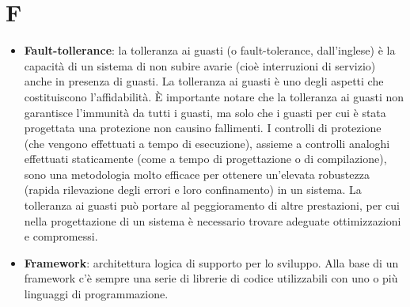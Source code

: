 \section{F}
\begin{itemize} 
	\item
	\textbf{Fault-tollerance}: la tolleranza ai guasti (o fault-tolerance, dall'inglese) è la capacità di un sistema di non subire avarie (cioè interruzioni di servizio) anche in presenza di guasti. La tolleranza ai guasti è uno degli aspetti che costituiscono l'affidabilità. È importante notare che la tolleranza ai guasti non garantisce l'immunità da tutti i guasti, ma solo che i guasti per cui è stata progettata una protezione non causino fallimenti.
	I controlli di protezione (che vengono effettuati a tempo di esecuzione), assieme a controlli analoghi effettuati staticamente (come a tempo di progettazione o di compilazione), sono una metodologia molto efficace per ottenere un'elevata robustezza (rapida rilevazione degli errori e loro confinamento) in un sistema.
	La tolleranza ai guasti può portare al peggioramento di altre prestazioni, per cui nella progettazione di un sistema è necessario trovare adeguate ottimizzazioni e compromessi.
	\item
	\textbf{Framework}: architettura logica di supporto per lo sviluppo. Alla base di un framework c’è sempre una serie di librerie di codice utilizzabili con uno o più linguaggi di programmazione.
\end{itemize}